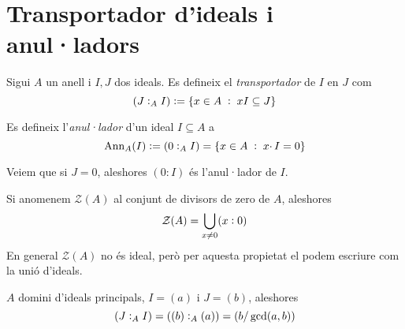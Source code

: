 \documentclass[../../../main.tex]{subfiles}
\begin{document}
\section{Transportador d'ideals i anul·ladors}


\begin{defi}
Sigui $A$ un anell i $I,J$ dos ideals. Es defineix el \textit{transportador} de $I$ en $J$ com
\begin{equation}
    \notag
    (J:_AI):=\{x\in A\;:\;xI\subseteq J\}
\end{equation}
\end{defi}

\begin{defi}
\label{def:anulador} Es defineix l'\textit{anul·lador} d'un ideal $I\subseteq A$ a
\begin{equation}
    \notag
    \operatorname{Ann}_A(I) := (0:_AI) = \{x\in A\;:\;x\cdotp I = 0\}
\end{equation}
\end{defi}

\begin{nota}
Veiem que si $J = 0$, aleshores $(0:I)$ és l'anul·lador de $I$. 
\end{nota}

\begin{nota}
Si anomenem $\mathcal{Z}(A)$ al conjunt de divisors de zero de $A$, aleshores 
\begin{equation}
    \notag
    \mathcal{Z}(A) = \bigcup_{x\not = 0}(x:0)
\end{equation}
En general $\mathcal{Z}(A)$ no és ideal, però per aquesta propietat el podem escriure com la unió d'ideals.
\end{nota}

\begin{ej}
$A$ domini d'ideals principals, $I = (a)$ i $J = (b)$, aleshores
\begin{equation}
    \notag
    (J:_AI) = ((b):_A(a)) = (b/\gcd(a,b))
\end{equation}
\end{ej}
\end{document}
